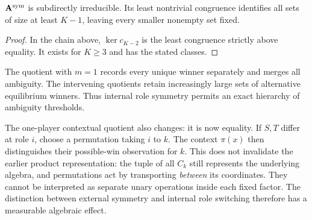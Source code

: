 \begin{corollary}
$\mathbf A^{\mathrm{sym}}$ is subdirectly irreducible. Its least nontrivial
congruence identifies all sets of size at least $K-1$, leaving every
smaller nonempty set fixed.
\end{corollary}
\begin{proof}
In the chain above, $\ker c_{K-2}$ is the least congruence strictly above
equality. It exists for $K\geq3$ and has the stated classes.
\end{proof}

The quotient with $m=1$ records every unique winner separately and merges
all ambiguity. The intervening quotients retain increasingly large sets
of alternative equilibrium winners. Thus internal role symmetry permits
an exact hierarchy of ambiguity thresholds.

The one-player contextual quotient also changes: it is now equality.
If $S,T$ differ at role $i$, choose a permutation taking $i$ to $k$.
The context $\pi(x)$ then distinguishes their possible-win observation
for $k$. This does not invalidate the earlier product representation:
the tuple of all $C_k$ still represents the underlying algebra, and
permutations act by transporting \emph{between} its coordinates. They
cannot be interpreted as separate unary operations inside each fixed
factor. The distinction between external symmetry and internal role
switching therefore has a measurable algebraic effect.
